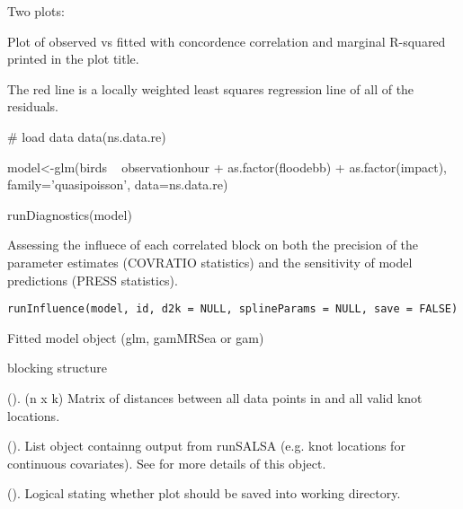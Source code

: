 \documentclass[a4paper]{book}
\begin{document}
%
\begin{Value}
Two plots:
\begin{ldescription}
\item[\code{Observed vs Fitted}] Plot of observed vs fitted with concordence correlation and marginal R-squared printed in the plot title.
\item[\code{Fitted vs scaled Pearsons residuals}] The red line is a locally weighted least squares regression line of all of the residuals.
\end{ldescription}
\end{Value}
%
\begin{Examples}
\begin{ExampleCode}
# load data
data(ns.data.re)

model<-glm(birds ~ observationhour + as.factor(floodebb) + as.factor(impact), 
           family='quasipoisson', data=ns.data.re)

runDiagnostics(model)

\end{ExampleCode}
\end{Examples}
%
\begin{Description}\relax
Assessing the influece of each correlated block on both the precision of the parameter estimates (COVRATIO statistics) and the sensitivity of model predictions (PRESS statistics).
\end{Description}
%
\begin{Usage}
\begin{verbatim}
runInfluence(model, id, d2k = NULL, splineParams = NULL, save = FALSE)
\end{verbatim}
\end{Usage}
%
\begin{Arguments}
\begin{ldescription}
\item[\code{model}] Fitted model object (glm, gamMRSea or gam)

\item[\code{id}] blocking structure

\item[\code{d2k}] (). (n x k) Matrix of distances between all data points in  and all valid knot locations.

\item[\code{splineParams}] (). List object containng output from runSALSA (e.g. knot locations for continuous covariates). See  for more details of this object.

\item[\code{save}] (). Logical stating whether plot should be saved into working directory.
\end{ldescription}
\end{Arguments}
\end{document}

